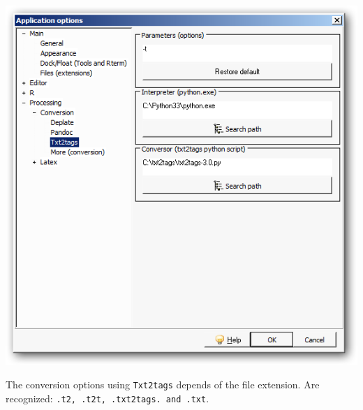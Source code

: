 \begin{itemize}
\begin{enumerate}
        \includegraphics[scale=0.50]{./res/app_processing_conversion_txt2tags.png}\\
    \end{enumerate}
\end{itemize}

The conversion options using \texttt{Txt2tags} depends of the file extension.
Are recognized: \texttt{.t2, .t2t, .txt2tags. and .txt}.
